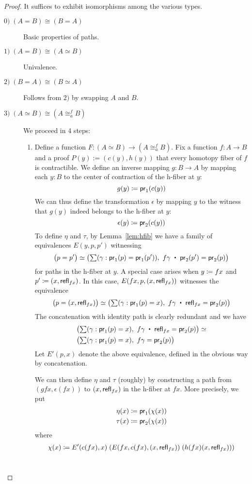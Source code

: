 \begin{proof}
It suffices to exhibit isomorphisms among the various types.
\begin{description}
\item [$\mathit{0)} \; (A = B) \cong (B = A)$]
Basic properties of paths.

\item[$\mathit{1)} \; (A = B) \cong (A \simeq B)$]
Univalence.

\item[$\mathit{2)} \; (B = A) \cong (B \simeq A)$]
Follows from $\mathit{2)}$ by swapping $A$ and $B$.

\item[$\mathit{3)} \; (A \simeq B) \cong (A \cong^f_a B)$] We proceed in 4 steps:
\begin{enumerate}
\item Define a function $F : (A \simeq B) \to (A \cong^f_a B)$. Fix a function $f : A \to B$ and a proof $P(y) := (c(y), h(y))$ that every homotopy fiber of $f$ is contractible.
We define an inverse mapping $g : B \to A$ by mapping each $y : B$ to the center of contraction of the h-fiber at $y$:
\[ g(y) \coloneqq \mathsf{pr}_{1}(c(y)) \]
We can thus define the transformation $\epsilon$ by mapping $y$ to the witness that $g(y)$ indeed belongs to the h-fiber at $y$:
\[ \epsilon(y) \coloneqq \mathsf{pr}_{2}(c(y)) \]
To define $\eta$ and $\tau$, by Lemma~\ref{lem:hfib} we have a family of equivalences $E(y,p,p')$ witnessing
\[ \big( p = p' \big) \simeq \big( \sm{\gamma : \proj{1}(p) = \proj{1}(p')} f\gamma \; \ct \; \proj{2}(p') = \proj{2}(p) \big) \]
for paths in the h-fiber at $y$. A special case arises when $y \coloneqq fx$ and $p' \coloneqq (x,\mathsf{refl}_{fx})$. In this case,
$E(fx,p,(x,\mathsf{refl}_{fx}))$ witnesses the equivalence
\[ \big( p = (x,\refl{fx}) \big) \simeq \big( \sm{\gamma : \proj{1}(p) = x} f\gamma \; \ct \; \refl{fx} = \proj{2}(p) \big) \]
The concatenation with identity path is clearly redundant and we have
\begin{align*}
& \big( \sm{\gamma : \proj{1}(p) = x} f\gamma \; \ct \; \refl{fx} = \proj{2}(p) \big) \simeq \\ 
& \big( \sm{\gamma : \proj{1}(p) = x} f\gamma = \proj{2}(p) \big)
\end{align*}
Let $E'(p,x)$ denote the above equivalence, defined in the obvious way by concatenation.
\medskip

We can then define $\eta$ and $\tau$ (roughly) by constructing a path from $(gfx,\epsilon(fx))$ to $(x,\mathsf{refl}_{fx})$ in the h-fiber at $fx$. More precisely, we put
\begin{align*}
\eta(x) & \coloneqq \mathsf{pr}_{1} (\chi(x)) \\
\tau(x) & \coloneqq \mathsf{pr}_{2} (\chi(x))
\end{align*}
where
\begin{align*} \chi(x) \coloneqq E'(c(fx), x) \; (E(fx, c(fx), (x,\mathsf{refl}_{fx})) \; (h(fx)(x, \mathsf{refl}_{fx}))) \end{align*} \\



\end{enumerate}
\end{description}
\end{proof}
